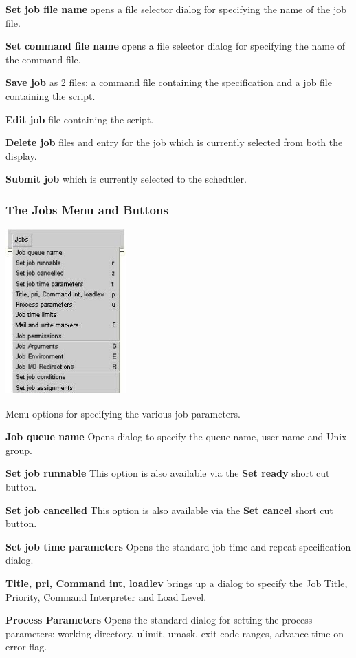 \textbf{Set job file name}  opens a file selector dialog for specifying the name of the job file.

\textbf{Set command file name} opens a file selector dialog for specifying the name of the command file.

\textbf{Save job} as 2 files: a command file containing the specification and a job file containing the script.

\textbf{Edit job} file containing the script.

\textbf{Delete job} files and \PrXmbtr{} entry for the job which is currently selected from both the display.

\textbf{Submit job} which is currently selected to the scheduler.

\subsubsection{The Jobs Menu and Buttons}
 \includegraphics[width=4.657cm,height=6.346cm]{img/ref43.jpg} 

Menu options for specifying the various job parameters.

\textbf{Job queue name} Opens dialog to specify the queue name, user name and Unix group.

\textbf{Set job runnable} This option is also available via the \textbf{Set ready} short cut button.

\textbf{Set job cancelled} This option is also available via the \textbf{Set cancel} short cut button.

\textbf{Set job time parameters} Opens the standard job time and repeat specification dialog.

\textbf{Title, pri, Command int, loadlev} brings up a dialog to specify the Job Title, Priority, Command Interpreter and Load Level.

\textbf{Process Parameters} Opens the standard dialog for setting the process parameters: working directory, ulimit, umask, exit code ranges,
advance time on error flag.


